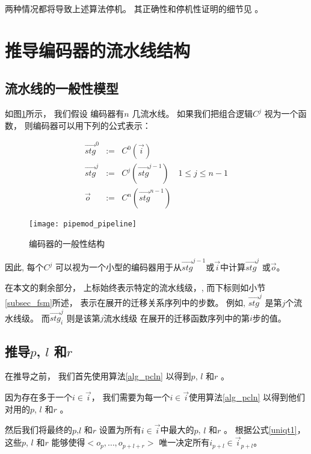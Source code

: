 两种情况都将导致上述算法停机。
其正确性和停机性证明的细节见\cite{ShenTCAD11} 。



\section{推导编码器的流水线结构}\label{sec_pipeinfer}

\subsection{流水线的一般性模型}
如图\ref{fig_pipeenc}所示，
我们假设
编码器有$n$ 几流水线。
如果我们把组合逻辑$C^j$ 视为一个函数，
则编码器可以用下列的公式表示：

\begin{equation}\label{equ_genpipe}
\begin{array}{cccc}
\vec{stg}^0   & := & C^0(\vec{i})         &\\
\vec{stg}^j   & := & C^j(\vec{stg}^{j-1}) & 1\le j\le n-1\\
\vec{o}       & := & C^n(\vec{stg}^{n-1}) &
\end{array}
\end{equation}


\begin{figure}[b]
\begin{center}
\texttt{[image: pipemod\_pipeline]}
\end{center}
\caption{编码器的一般性结构}
  \label{fig_pipeenc}
\end{figure}


因此,
每个$C^j$ 可以视为一个小型的编码器用于从$\vec{stg}^{j-1}$或$\vec{i}$中计算$\vec{stg}^j$ 或$\vec{o}$。


在本文的剩余部分，
上标始终表示特定的流水线级，,
而下标则如小节\ref{subsec_fsm}所述，
表示在展开的迁移关系序列中的步数。
例如,
$\vec{stg}^j$ 是第$j$个流水线级。
而$\vec{stg}^j_i$ 则是该第$j$流水线级
在展开的迁移函数序列中的第$i$步的值。

\subsection{推导$p$, $l$ 和$r$}\label{subsec_inferplr}
在推导之前，
我们首先使用算法\ref{alg_pcln} 以得到$p$, $l$ 和$r$ 。

因为存在多于一个$i\in \vec{i}$，
我们需要为每一个$i\in \vec{i}$使用算法\ref{alg_pcln} 
以得到他们对用的$p$, $l$ 和$r$ 。

然后我们将最终的$p$,$l$ 和$r$ 设置为所有$i\in \vec{i}$中最大的$p$, $l$ 和$r$ 。
根据公式\ref{uniqt1}，
这些$p$, $l$ 和$r$ 能够使得$<o_{p},\dots,o_{p+l+r}>$ 唯一决定所有$i_{p+l}\in \vec{i}_{p+l}$。


